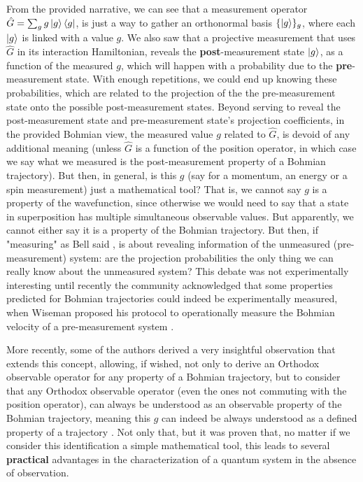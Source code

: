 \documentclass[11pt, a4paper]{article} %
\begin{document}
From the provided narrative, we can see that a measurement operator $\hat{G}=\sum_g g\ket{g}\bra{g}$, is just a way to gather an orthonormal basis $\{\ket{g}\}_g$, where each $\ket{g}$ is linked with a value $g$. We also saw that a projective measurement that uses $\hat{G}$ in its interaction Hamiltonian, reveals the {\bf post}-measurement state $\ket{g}$, as a function of the measured $g$, which will happen with a probability due to the {\bf pre}-measurement state. With enough repetitions, we could end up knowing these probabilities, which are related to the projection of the the pre-measurement state onto the possible post-measurement states. Beyond serving to reveal the post-measurement state and pre-measurement state's projection coefficients, in the provided Bohmian view, the measured value $g$ related to $\hat{G}$, is devoid of any additional meaning (unless $\hat{G}$ is a function of the position operator, in which case we say what we measured is the post-measurement property of a Bohmian trajectory). But then, in general, is this $g$ (say for a momentum, an energy or a spin measurement) just a mathematical tool? That is, we cannot say $g$ is a property of the wavefunction, since otherwise we would need to say that a state in superposition has multiple simultaneous observable values. But apparently, we cannot either say it is a property of the Bohmian trajectory. But then, if "measuring" as Bell said \cite{Bell}, is about revealing information of the unmeasured (pre-measurement) system: are the projection probabilities the only thing we can really know about the unmeasured system? This debate was not experimentally interesting until recently the community acknowledged that some properties predicted for Bohmian trajectories could indeed be experimentally measured, when Wiseman proposed his protocol to operationally measure the Bohmian velocity of a pre-measurement system \cite{WisemanVel}.

More recently, some of the authors derived a very insightful observation that extends this concept, allowing, if wished, not only to derive an Orthodox observable operator for any property of a Bohmian trajectory, but to consider that any Orthodox observable operator (even the ones not commuting with the position operator), can always be understood as an observable property of the Bohmian trajectory, meaning this $g$ can indeed be always understood as a defined property of a trajectory \cite{DevInPosition1, DevInPosition2}. Not only that, but it was proven that, no matter if we consider this identification a simple mathematical tool, this leads to several {\bf practical} advantages in the characterization of a quantum system in the absence of observation.
\end{document}
